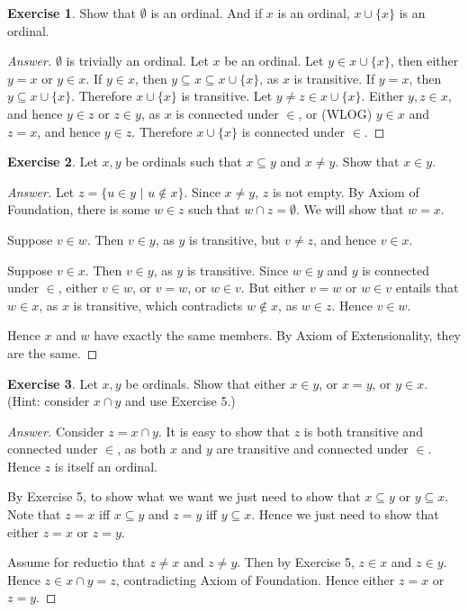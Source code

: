 \documentclass[11pt]{article}
\theoremstyle{definition}
\newtheorem{exer}{Exercise}
\begin{document}
\begin{exer}
Show that $\emptyset$ is an ordinal. And if $x$ is an ordinal, $x \cup \{x\}$ is an ordinal.
\end{exer}

\begin{proof}[Answer]
$\emptyset$ is trivially an ordinal. Let $x$ be an ordinal. Let $y \in x \cup \{x\}$, then either $y = x$ or $y \in x$. If $y \in x$, then $y \subseteq x \subseteq x \cup \{x\}$, as $x$ is transitive. If $y = x$, then $y \subseteq x \cup \{x\}$. Therefore $x \cup \{x\}$ is transitive. Let $y \neq z \in x \cup \{x\}$. Either $y, z \in x$, and hence $y \in z$ or $z \in y$, as $x$ is connected under $\in$, or (WLOG) $y \in x$ and $z = x$, and hence $y \in z$. Therefore $x \cup \{x\}$ is connected under $\in$.

\end{proof}

\begin{exer}
Let $x, y$ be ordinals such that $x \subseteq y$ and $x \neq y$. Show that $x \in y$.
\end{exer}

\begin{proof}[Answer]
Let $z = \{ u \in y \, \, | \, \, u \notin x\}$. Since $x \neq y$, $z$ is not empty. By Axiom of Foundation, there is some $w \in z$ such that $w \cap z  = \emptyset$. We will show that $w = x$.

Suppose $v \in w$. Then $v \in y$, as $y$ is transitive, but $v \neq z$, and hence $v \in x$.

Suppose $v \in x$. Then $v \in y$, as $y$ is transitive. Since $w \in y$ and $y$ is connected under $\in$, either $v \in w$, or $v = w$, or $w \in v$. But either $v = w$ or $w \in v$ entails that $w \in x$, as $x$ is transitive, which contradicts $w \notin x$, as $w \in z$. Hence $v \in w$. 

Hence $x$ and $w$ have exactly the same members. By Axiom of Extensionality, they are the same.

\end{proof}

\begin{exer}
Let $x, y$ be ordinals. Show that either $x \in y$, or $x = y$, or $y \in x$. (Hint: consider $x \cap y$ and use Exercise 5.)

\end{exer}

\begin{proof}[Answer]
Consider $z = x \cap y$. It is easy to show that $z$ is both transitive and connected under $\in$, as both $x$ and $y$ are transitive and connected under $\in$. Hence $z$ is itself an ordinal.

By Exercise 5, to show what we want we just need to show that $x \subseteq y$ or $y \subseteq x$. Note that $z = x$ iff $x \subseteq y$ and $z = y$ iff $y \subseteq x$. Hence we just need to show that either $z = x$ or $z = y$.

Assume for reductio that $z \neq x$ and $z \neq y$. Then by Exercise 5, $z \in x$ and $z \in y$. Hence $z \in x \cap y = z$, contradicting Axiom of Foundation. Hence either  $z = x$ or $z = y$.

\end{proof}
\end{document}
